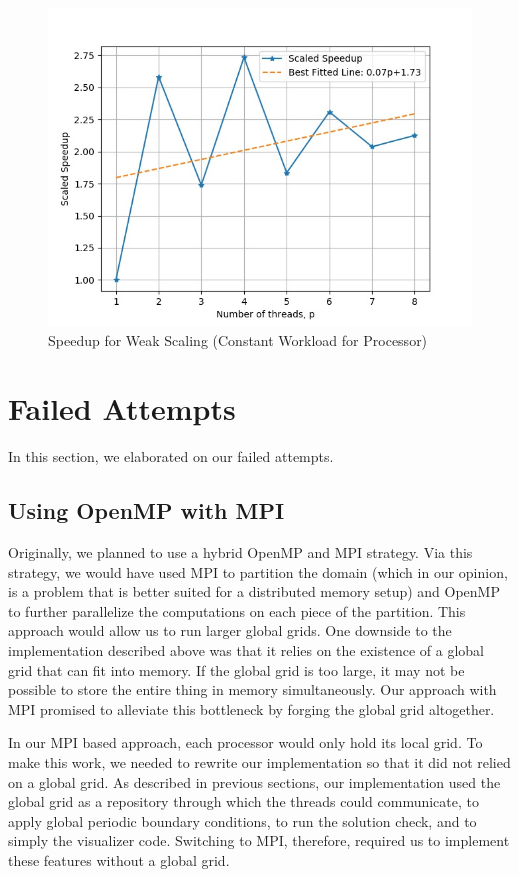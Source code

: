 \documentclass{article}
\begin{document}
\begin{figure}[h!]
	\centering
	\includegraphics[width=0.8\columnwidth]{../weak_scaling_v2.jpg}
	\caption{Speedup for Weak Scaling (Constant Workload for Processor)}
	\label{fig:weak_scaling_v2}
\end{figure}

\section{Failed Attempts}
In this section, we elaborated on our failed attempts. 
\subsection{Using OpenMP with MPI}
Originally, we planned to use a hybrid OpenMP and MPI strategy.
Via this strategy, we would have used MPI to partition the domain (which in our opinion, is a problem that is better suited for a distributed memory setup) 
and OpenMP to further parallelize the computations on each piece of the partition.
This approach would allow us to run larger global grids.
One downside to the implementation described above was that it relies on the existence of a global grid that can fit into memory.
If the global grid is too large, it may not be possible to store the entire thing in memory simultaneously.
Our approach with MPI promised to alleviate this bottleneck by forging the global grid altogether.

In our MPI based approach, each processor would only hold its local grid.
To make this work, we needed to rewrite our implementation so that it did not relied on a global grid.
As described in previous sections, our implementation used the global grid as a repository through which the threads could communicate, to apply global periodic boundary conditions, to run the solution check, and to simply the visualizer code.
Switching to MPI, therefore, required us to implement these features without a global grid.
\end{document}
